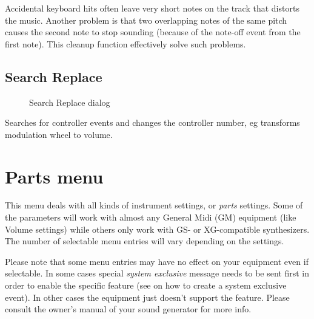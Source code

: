 \documentclass[letterpaper]{report}
\begin{document}
Accidental keyboard hits often leave very short notes on the track that
distorts the music. Another problem is that two overlapping notes of the
same pitch causes the second note to stop sounding (because of the note-off
event from the first note). This cleanup function effectively solve such
problems.

\subsection{Search Replace}\label{search}

\begin{figure}
\caption{Search Replace dialog}
\end{figure}

Searches for controller events and changes the controller number, eg
transforms modulation wheel to volume.





\section{Parts menu}\label{partsmenu}

This menu deals with all kinds of instrument settings, or {\em parts} settings.
Some of the parameters will work with
almost any General Midi (GM) equipment (like Volume settings) while
others only work with GS- or XG-compatible synthesizers. The number of
selectable menu entries will vary depending on the
 settings.

Please note that some
menu entries may have no effect on your equipment even if selectable. In some
cases special {\em system exclusive} message needs to be sent
first in order to enable the specific feature
(see  on how to create a
system exclusive event).
In other cases the equipment just doesn't support the feature.
Please consult the owner's manual of your sound generator for more info.
\end{document}
